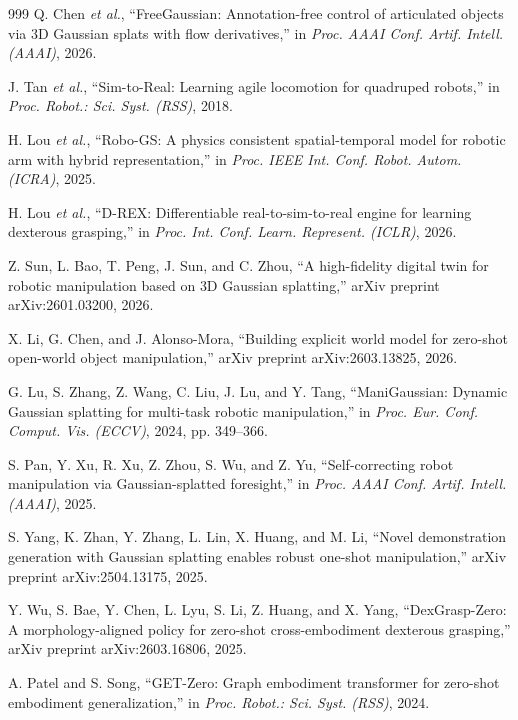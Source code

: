 \documentclass[12pt,a4paper,oneside]{report}
\begin{document}
\begin{thebibliography}{999}
Q. Chen \textit{et al.}, ``{FreeGaussian}: Annotation-free control of articulated objects via {3D} Gaussian splats with flow derivatives,'' in \textit{Proc. AAAI Conf. Artif. Intell. (AAAI)}, 2026.

J. Tan \textit{et al.}, ``{Sim-to-Real}: Learning agile locomotion for quadruped robots,'' in \textit{Proc. Robot.: Sci. Syst. (RSS)}, 2018.

H. Lou \textit{et al.}, ``{Robo-GS}: A physics consistent spatial-temporal model for robotic arm with hybrid representation,'' in \textit{Proc. IEEE Int. Conf. Robot. Autom. (ICRA)}, 2025.

H. Lou \textit{et al.}, ``D-REX: Differentiable real-to-sim-to-real engine for learning dexterous grasping,'' in \textit{Proc. Int. Conf. Learn. Represent. (ICLR)}, 2026.

Z. Sun, L. Bao, T. Peng, J. Sun, and C. Zhou, ``A high-fidelity digital twin for robotic manipulation based on {3D} Gaussian splatting,'' arXiv preprint arXiv:2601.03200, 2026.

X. Li, G. Chen, and J. Alonso-Mora, ``Building explicit world model for zero-shot open-world object manipulation,'' arXiv preprint arXiv:2603.13825, 2026.

G. Lu, S. Zhang, Z. Wang, C. Liu, J. Lu, and Y. Tang, ``{ManiGaussian}: Dynamic Gaussian splatting for multi-task robotic manipulation,'' in \textit{Proc. Eur. Conf. Comput. Vis. (ECCV)}, 2024, pp. 349--366.

S. Pan, Y. Xu, R. Xu, Z. Zhou, S. Wu, and Z. Yu, ``Self-correcting robot manipulation via Gaussian-splatted foresight,'' in \textit{Proc. AAAI Conf. Artif. Intell. (AAAI)}, 2025.

S. Yang, K. Zhan, Y. Zhang, L. Lin, X. Huang, and M. Li, ``Novel demonstration generation with Gaussian splatting enables robust one-shot manipulation,'' arXiv preprint arXiv:2504.13175, 2025.

Y. Wu, S. Bae, Y. Chen, L. Lyu, S. Li, Z. Huang, and X. Yang, ``{DexGrasp-Zero}: A morphology-aligned policy for zero-shot cross-embodiment dexterous grasping,'' arXiv preprint arXiv:2603.16806, 2025.

A. Patel and S. Song, ``{GET-Zero}: Graph embodiment transformer for zero-shot embodiment generalization,'' in \textit{Proc. Robot.: Sci. Syst. (RSS)}, 2024.


\end{thebibliography}
\end{document}
